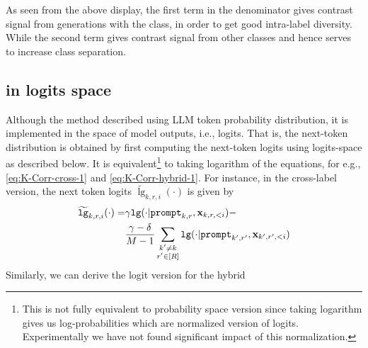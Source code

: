 As seen from the above display, the first term in the denominator gives contrast signal from generations with the class, in order to get good intra-label diversity. While the second term gives contrast signal from other classes and hence serves to increase class separation. 

\subsection{\corrsyn{} in logits space}
\label{sec:logit_corrsyn}
 Although the \corrsyn{} method described using LLM token probability distribution, it is implemented in the space of model outputs, i.e., logits. That is, the next-token distribution is obtained by first computing the next-token logits using logits-space \corrsyn{} as described below. It is equivalent\footnote{This is not fully equivalent to probability space version since taking logarithm gives us log-probabilities which are normalized version of logits. Experimentally we have not found significant impact of this normalization.} to taking logarithm of the \corrsyn{} equations, for e.g., \eqref{eq:K-Corr-cross-1} and \eqref{eq:K-Corr-hybrid-1}. For instance, in the cross-label version, the next token logits $\tilde \lg_{k,r,i}(\cdot)$ is given by
  \begin{align}
 \begin{aligned}
      \widetilde {\mathtt{lg}}_{k,r,i}(\cdot) =&\gamma\mathtt{lg}(\cdot| \mathtt{prompt}_{k,r},\mathbf{x}_{k,r,<i}) -\\
      &\frac{\gamma-\delta}{M-1}\sum_{\substack {k'\neq k\\ r'\in[R]}}\mathtt{lg}(\cdot| \mathtt{prompt}_{k',r'},\mathbf{x}_{k',r',<i}) \label{eq:K-Corr-cross-logit-1}
 \end{aligned}
 \end{align}
Similarly, we can derive the logit version for the hybrid \corrsyn{}

